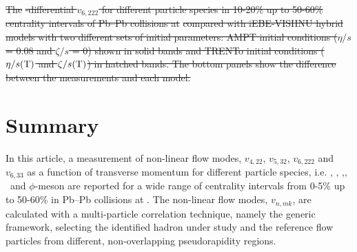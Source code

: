 \documentclass[ALICE,manyauthors]{cernphprep}
\providecommand{\DIFdeltex}[1]{{\protect\color{red}\sout{#1}}}                      %
\providecommand{\DIFdelbegin}{} %
\providecommand{\DIFdelend}{} %
\providecommand{\DIFdelFL}[1]{\DIFdel{#1}} %
\providecommand{\DIFdel}[1]{\texorpdfstring{\DIFdeltex{#1}}{}} %
\begin{document}
\DIFdelbegin %
{%
\DIFdelFL{The }%
\DIFdelFL{-differential $v_{6,222}$ for different particle species in 10-20\% up to 50-60\% centrality intervals of Pb--Pb collisions at }%
\DIFdelFL{compared with iEBE-VISHNU hybrid models with two different sets of initial parameters: AMPT initial conditions ($\eta/s$= 0.08 and $\zeta/s$ = 0) shown in solid bands and TRENTo initial conditions ($\eta/s({\rm T})$ and $\zeta/s({\rm T})$) in hatched bands. The bottom panels show the difference between the measurements and each model.}}

\DIFdelend \newpage
\newpage

\section{Summary}
\label{Sec:conclusion}

In this article, a measurement of non-linear flow modes, $v_{4,22}$, $v_{5,32}$, $v_{6,222}$ and $v_{6,33}$ as a function of transverse momentum for different particle species, i.e. \pion, \kaon, \Ks,\proton, \lambdas~and $\phi$-meson are reported for a wide range of centrality intervals from 0-5\% up to 50-60\% in Pb--Pb collisions at \sNN. The non-linear flow modes, $v_{n,mk}$, are calculated with a multi-particle correlation technique, namely the generic framework, selecting the identified hadron under study and the reference flow particles from different, non-overlapping pseudorapidity regions.  
\end{document}
